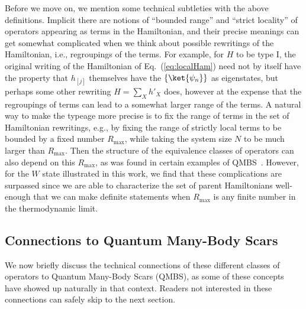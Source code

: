 \documentclass[prx,letterpaper,aps,superscriptaddress,floatfix,twocolumn,nofootinbib]{revtex4-2}
\theoremstyle{definition}
\begin{document}
%
Before we move on, we mention some technical subtleties with the above definitions.
%
Implicit there are notions of ``bounded range'' and ``strict locality'' of operators appearing as terms in the Hamiltonian, and their precise meanings can get somewhat complicated when we think about possible rewritings of the Hamiltonian, i.e., regroupings of the terms.
%
For example, for $H$ to be type I, the original writing of the Hamiltonian of Eq.~(\ref{eq:localHam}) need not by itself have the property that $h_{[j]}$ themselves have the $\{\ket{\psi_n}\}$ as eigenstates, but perhaps some other rewriting $H = \sum_X h'_X$ does, however at the expense that the regroupings of terms can lead to a somewhat larger range of the terms.
%
A natural way to make the typeage more precise is to fix the range of terms in the set of Hamiltonian rewritings, e.g., by fixing the range of strictly local terms to be bounded by a fixed number $R_{\text{max}}$, while taking the system size $N$ to be much larger than $R_{\text{max}}$.
%
Then the structure of the equivalence classes of operators can also depend on this $R_{\text{max}}$, as was found in certain examples of QMBS~\cite{moudgalya2023exhaustive, moudgalya2023numerical}.
%
However, for the $W$ state illustrated in this work, we find that these complications are surpassed since we are able to characterize the set of parent Hamiltonians well-enough that we can make definite statements when $R_{\text{max}}$ is any finite number in the thermodynamic limit. 
%

%
\subsection{Connections to Quantum Many-Body Scars}\label{subsec:qmbsconn}
%
We now briefly discuss the technical connections of these different classes of operators to Quantum Many-Body Scars (QMBS), as some of these concepts have showed up naturally in that context.
%
Readers not interested in these connections can safely skip to the next section. 
%
\end{document}
